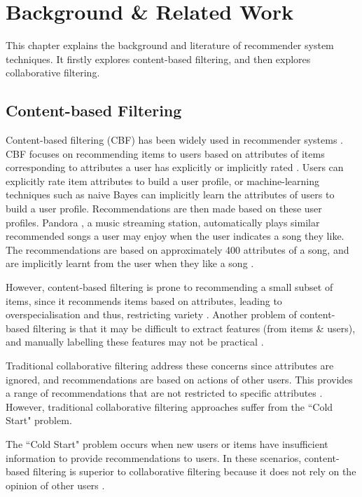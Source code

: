 \chapter{Background \& Related Work}\label{C:background}

This chapter explains the background and literature of recommender system techniques. It firstly explores content-based filtering, and then explores collaborative filtering.

\section{Content-based Filtering}

Content-based filtering (CBF) has been widely used in recommender systems \cite{koren2011, hybrid,toward, bogers2009collaborative}. CBF focuses on recommending items to users based on attributes of items corresponding to attributes a user has explicitly or implicitly rated \cite{koren2011}. Users can explicitly rate item attributes to build a user profile, or machine-learning techniques such as naive Bayes \cite{koren2011, bogers2009collaborative} can implicitly learn the attributes of users to build a user profile. Recommendations are then made based on these user profiles. Pandora \cite{pandora, howepandora}, a music streaming station, automatically plays similar recommended songs a user may enjoy when the user indicates a song they like. The recommendations are based on approximately 400 attributes of a song, and are implicitly learnt from the user when they like a song \cite{howepandora}.

However, content-based filtering is prone to recommending a small subset of items, since it recommends items based on attributes, leading to overspecialisation and thus, restricting variety \cite{toward}. Another problem of content-based filtering is that it may be difficult to extract features (from items \& users), and manually labelling these features may not be practical \cite{toward}.

Traditional collaborative filtering address these concerns since attributes are ignored, and recommendations are based on actions of other users. This provides a range of recommendations that are not restricted to specific attributes \cite{koren2009matrix}. However, traditional collaborative filtering approaches suffer from the ``Cold Start" problem. 

The ``Cold Start" problem occurs when new users or items have insufficient information to provide recommendations to users. In these scenarios, content-based filtering is superior to collaborative filtering because it does not rely on the opinion of other users \cite{koren2009matrix}.

